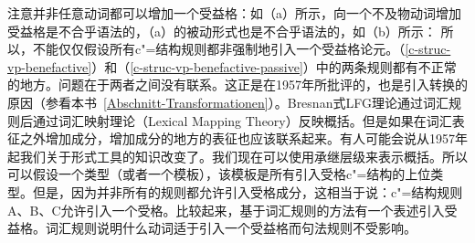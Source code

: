 \ea\label{c-struc-vp-benefactive-passive}
\z
注意并非任意动词都可以增加一个受益格：如（a）所示，向一个不及物动词增加受益格是不合乎语法的，（a）的被动形式也是不合乎语法的，如（b）所示：
\eal
{}
\zl
所以，不能仅仅假设所有c"=结构规则都非强制地引入一个受益格论元。（\ref{c-struc-vp-benefactive}）和（\ref{c-struc-vp-benefactive-passive}）中的两条规则都有不正常的地方。问题在于两者之间没有联系。这正是\citet[]{Chomsky57a}在1957年所批评的，也是引入转换的原因（参看本书~\ref{Abschnitt-Transformationen}）。Bresnan式LFG理论通过词汇规则后通过词汇映射理论（Lexical Mapping Theory）反映概括。但是如果在词汇表征之外增加成分，增加成分的地方的表征也应该联系起来。有人可能会说从1957年起我们关于形式工具的知识改变了。我们现在可以使用承继层级来表示概括。所以可以假设一个类型（或者一个模板），该模板是所有引入受格c"=结构的上位类型。但是，因为并非所有的规则都允许引入受格成分，这相当于说：c"=结构规则A、B、C允许引入一个受格。比较起来，基于词汇规则的方法有一个表述引入受益格。词汇规则说明什么动词适于引入一个受益格而句法规则不受影响。
